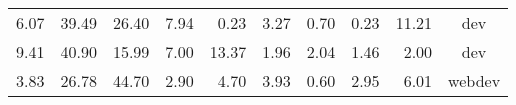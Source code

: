 \begin{table}[]
\begin{tabular}{@{}rrrrrrrrrc@{}}
      6.07                                                                            & 39.49                                                                                  & 26.40                                                                          & 7.94                                                                                     & 0.23                                                                                     & 3.27                                                                            & 0.70                                                                                     & 0.23                                                                           & 11.21                                                                            & dev                                                           \\
      9.41                                                                            & 40.90                                                                                  & 15.99                                                                          & 7.00                                                                                     & 13.37                                                                                    & 1.96                                                                            & 2.04                                                                                     & 1.46                                                                           & 2.00                                                                             & dev                                                           \\
      3.83                                                                            & 26.78                                                                                  & 44.70                                                                          & 2.90                                                                                     & 4.70                                                                                     & 3.93                                                                            & 0.60                                                                                     & 2.95                                                                           & 6.01                                                                             & webdev                                                        \\

\end{tabular}
\end{table}
